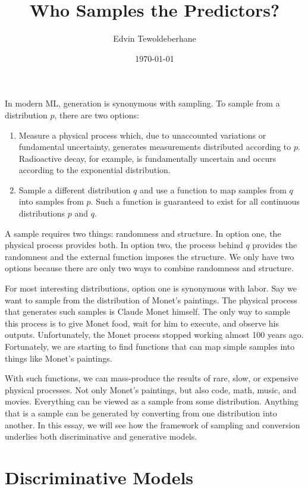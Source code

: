 \documentclass[11pt]{article}
\title{Who Samples the Predictors?}
\author{Edvin Tewoldeberhane}
\date{\today}
\begin{document}
\maketitle

In modern ML, generation is synonymous with sampling. To sample from a distribution $p$, there are two options:
\begin{enumerate}
    \item Measure a physical process which, due to unaccounted variations or
    fundamental uncertainty, generates measurements distributed according to
    $p$. Radioactive decay, for example, is fundamentally uncertain and occurs
    according to the exponential distribution.
    \item Sample a different distribution $q$ and use a function to map samples
    from $q$ into samples from $p$. Such a function is guaranteed to exist for
    all continuous distributions $p$ and $q$.
\end{enumerate}

A sample requires two things: randomness and structure. In option one, the physical process provides both. In option two, the process behind $q$ provides the randomness and the external function imposes the structure. We only have two options because there are only two ways to combine randomness and structure.

For most interesting distributions, option one is synonymous with labor. Say we want to sample from the distribution of Monet's paintings. The physical process that generates such samples is Claude Monet himself. The only way to sample this process is to give Monet food, wait for him to execute, and observe his outputs. Unfortunately, the Monet process stopped working almost 100 years ago. Fortunately, we are starting to find functions that can map simple samples into things like Monet's paintings.

With such functions, we can mass-produce the results of rare, slow, or expensive physical processes. Not only Monet's paintings, but also code, math, music, and movies. Everything can be viewed as a sample from some distribution. Anything that is a sample can be generated by converting from one distribution into another. In this essay, we will see how the framework of sampling and conversion underlies both discriminative and generative models.

\section*{Discriminative Models}
\end{document}
